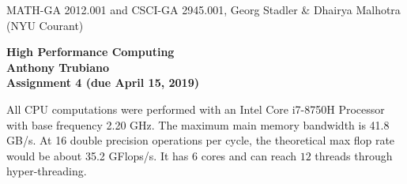 \documentclass[11pt]{article}
\begin{document}
\begin{center}
  \vspace*{-2cm}
{\small MATH-GA 2012.001 and CSCI-GA 2945.001, Georg Stadler \&
  Dhairya Malhotra (NYU Courant)}
\end{center}
\vspace*{.5cm}
\begin{center}
\large \textbf{%
High Performance Computing \\
Anthony Trubiano \\
Assignment 4 (due April 15, 2019) }
\end{center}


 All CPU computations were performed with an Intel Core i7-8750H Processor with base frequency 2.20 GHz. The maximum main memory bandwidth is 41.8 GB/s. At 16 double 
precision operations per cycle, the theoretical max flop rate would be about 35.2 GFlops/s. It has $6$ cores and can reach $12$ threads through hyper-threading. 
\end{document}
